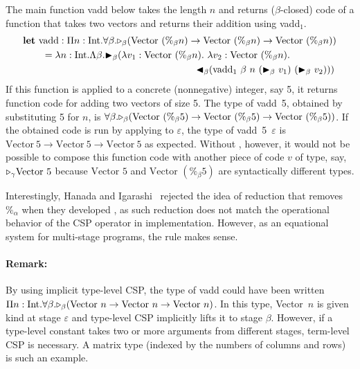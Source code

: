 The main function vadd below takes the length $n$ and returns
($\beta$-closed) code of a function that takes two vectors and returns
their addition using vadd$_1$.
\renewcommand{\Vpn}{\text{Vector}\ (\%_\beta n)}
\begin{align*}
	  & \textbf{let}\ \text{vadd}: \Pi n:\I.\F\beta.\TW_\beta(\Vpn\to\Vpn\to\Vpn)                \\ 
	  & \hspace{7mm} = \lambda n:\I.\Lambda\beta.\TB_\beta (\lambda v_1:\Vpn.\ \lambda v_2:\Vpn. \\
	  & \hspace{63mm} \TBL_\beta (\text{vadd}_1\ \beta\ n\ (\TB_\beta\ v_1)\ (\TB_\beta\ v_2))) 
\end{align*}
\renewcommand{\Vpn}{\text{Vector}\ (\%_\beta 5)}
If this function is applied to a concrete
(nonnegative) integer, say 5, it returns function code for adding
two vectors of size 5.  The type of vadd\ 5, obtained by
substituting 5 for $n$, is
$\F\beta.\TW_\beta(\Vpn\to\Vpn\to\Vpn)$.
\renewcommand{\Vpn}{\text{Vector}\ 5}
If the obtained code is run by applying to \(\varepsilon\),
the type of vadd\ 5\ $\varepsilon$ is
\(\Vpn\to\Vpn\to\Vpn\) as expected.
Without \QPercent, however, it would not be possible
to compose this function code with another piece of code
$v$ of type, say, \({\mathop{\triangleright}}_\gamma \text{Vector }5\) because
\(\text{Vector }5\) and \(\text{Vector }(\%_\beta 5)\) are
syntactically different types.

Interestingly, Hanada and Igarashi~\cite{Hanada2014} rejected the idea of
reduction that removes $\%_\alpha$ when they developed \LTP{}, as such
reduction does not match the operational behavior of the CSP operator
in implementation.  However, as an equational system for multi-stage
programs, the rule \QPercent makes sense.

\renewcommand{\Vpn}{\text{Vector}\ n}
\paragraph{Remark:} By using implicit type-level CSP, the type of vadd
could have been written
\(\Pi n:\I.\F\beta.\TW_\beta(\Vpn\to\Vpn\to\Vpn)\).  In this type,
Vector\ $n$ is given kind at stage \(\varepsilon\) and type-level CSP
implicitly lifts it to stage \(\beta\).  However, if a type-level
constant takes two or more arguments from different stages, term-level
CSP is necessary.  A matrix type (indexed by the numbers of columns
and rows) is such an example.


